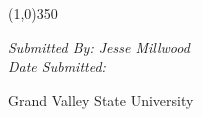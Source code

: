 
\begin{flushleft}

\textsc{\LARGE \bfseries \ASSNMT}\\

\textsc{\Large \CLASS}\\[0.2cm]
\linethickness{0.5mm}
{\color{MidnightBlue}\line(1,0){350}} \\ [5.0cm]

\begin{minipage}{0.8\textwidth}
\begin{flushleft} \large
\emph{Submitted By: Jesse Millwood \Partner} \\
\emph{Date Submitted: \DATE}
\end{flushleft}
\end{minipage}


\vfill

\begin{center}
{\large Grand Valley State University}
\end{center}
\end{flushleft}
\restoregeometry
\newpage
